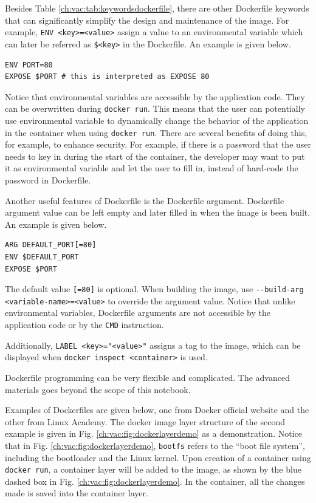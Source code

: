 Besides Table \ref{ch:vac:tab:keywordsdockerfile}, there are other Dockerfile keywords that can significantly simplify the design and maintenance of the image. For example, \verb|ENV <key>=<value>| assign a value to an environmental variable which can later be referred as \verb|$<key>| in the Dockerfile. An example is given below.
\begin{lstlisting}
ENV PORT=80
EXPOSE $PORT # this is interpreted as EXPOSE 80
\end{lstlisting}
Notice that environmental variables are accessible by the application code. They can be overwritten during \verb|docker run|. This means that the user can potentially use environmental variable to dynamically change the behavior of the application in the container when using \verb|docker run|. There are several benefits of doing this, for example, to enhance security. For example, if there is a password that the user needs to key in during the start of the container, the developer may want to put it as environmental variable and let the user to fill in, instead of hard-code the password in Dockerfile.

Another useful features of Dockerfile is the Dockerfile argument. Dockerfile argument value can be left empty and later filled in when the image is been built. An example is given below.
\begin{lstlisting}
ARG DEFAULT_PORT[=80]
ENV $DEFAULT_PORT
EXPOSE $PORT
\end{lstlisting}
The default value \verb|[=80]| is optional. When building the image, use \verb|--build-arg <variable-name>=<value>| to override the argument value. Notice that unlike environmental variables, Dockerfile arguments are not accessible by the application code or by the \verb|CMD| instruction.

Additionally, \verb|LABEL <key>="<value>"| assigns a tag to the image, which can be displayed when \verb|docker inspect <container>| is used.

Dockerfile programming can be very flexible and complicated. The advanced materials goes beyond the scope of this notebook.

Examples of Dockerfiles are given below, one from Docker official website and the other from Linux Academy. The docker image layer structure of the second example is given in Fig. \ref{ch:vac:fig:dockerlayerdemo} as a demonstration. Notice that in Fig. \ref{ch:vac:fig:dockerlayerdemo}, \verb|bootfs| refers to the ``boot file system'', including the bootloader and the Linux kernel. Upon creation of a container using \verb|docker run|, a container layer will be added to the image, as shown by the blue dashed box in Fig. \ref{ch:vac:fig:dockerlayerdemo}. In the container, all the changes made is saved into the container layer.

